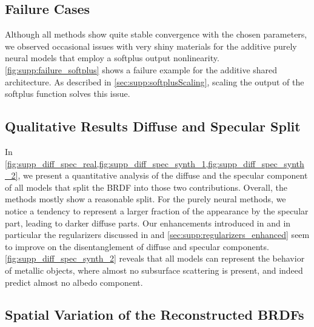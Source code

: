 \subsection{Failure Cases}
\label{sec:supp:failure_cases}



Although all methods show quite stable convergence with the chosen parameters, we observed occasional issues with very shiny materials for the additive purely neural models that employ a softplus output nonlinearity. \cref{fig:supp:failure_softplus} shows a failure example for the additive shared architecture. As described in \cref{sec:supp:softplusScaling}, scaling the output of the softplus function solves this issue.



\subsection{Qualitative Results Diffuse and Specular Split}
\label{sec:supp:qualitative_diffuse_specular}





In \cref{fig:supp_diff_spec_real,fig:supp_diff_spec_synth_1,fig:supp_diff_spec_synth_2}, we present a quantitative analysis of the diffuse and the specular component of all models that split the BRDF into those two contributions. Overall, the methods mostly show a reasonable split. For the purely neural methods, we notice a tendency to represent a larger fraction of the appearance by the specular part, leading to darker diffuse parts. Our enhancements introduced in \iftoggle{arxiv}{\cref{sec:enhancingAddSplit}}{Sec.~4.4}
and in particular the regularizers discussed in \iftoggle{arxiv}{\cref{sec:enhancingAddSplit}}{Sec.~4.4} and \cref{sec:supp:regularizers_enhanced} seem to improve on the disentanglement of diffuse and specular components. \cref{fig:supp_diff_spec_synth_2} reveals that all models can represent the behavior of metallic objects, where almost no subsurface scattering is present, and indeed predict almost no albedo component.


\subsection{Spatial Variation of the Reconstructed BRDFs}
\label{sec:supp:spat_var_recon_brdf}

